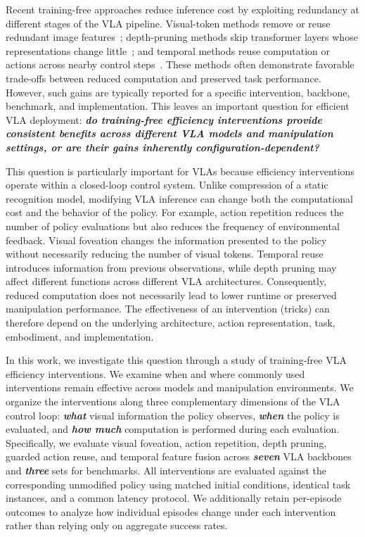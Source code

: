 Recent training-free approaches reduce inference cost by exploiting redundancy at different stages of the VLA pipeline. Visual-token methods remove or reuse redundant image features~\cite{fastv,vlacache,vlapruner}; depth-pruning methods skip transformer layers whose representations change little~\cite{shortgpt,efficientvla}; and temporal methods reuse computation or actions across nearby control steps~\cite{vlacache,flashvla,ttfvla}. These methods often demonstrate favorable trade-offs between reduced computation and preserved task performance. However, such gains are typically reported for a specific intervention, backbone, benchmark, and implementation. This leaves an important question for efficient VLA deployment: \textbf{\emph{do training-free efficiency interventions provide consistent benefits across different VLA models and manipulation settings, or are their gains inherently configuration-dependent?}}

This question is particularly important for VLAs because efficiency interventions operate within a closed-loop control system. Unlike compression of a static recognition model, modifying VLA inference can change both the computational cost and the behavior of the policy. For example, action repetition reduces the number of policy evaluations but also reduces the frequency of environmental feedback. Visual foveation changes the information presented to the policy without necessarily reducing the number of visual tokens. Temporal reuse introduces information from previous observations, while depth pruning may affect different functions across different VLA architectures. Consequently, reduced computation does not necessarily lead to lower runtime or preserved manipulation performance. The effectiveness of an intervention (tricks) can therefore depend on the underlying architecture, action representation, task, embodiment, and implementation.

In this work, we investigate this question through a study of training-free VLA efficiency interventions. We examine when and where commonly used interventions remain effective across models and manipulation environments. We organize the interventions along three complementary dimensions of the VLA control loop: \textbf{\emph{what}} visual information the policy observes, \textbf{\emph{when}} the policy is evaluated, and \textbf{\emph{how much}} computation is performed during each evaluation. Specifically, we evaluate visual foveation, action repetition, depth pruning, guarded action reuse, and temporal feature fusion across \textit{\textbf{seven}} VLA backbones and \textbf{\textit{three}} sets for benchmarks. All interventions are evaluated against the corresponding unmodified policy using matched initial conditions, identical task instances, and a common latency protocol. We additionally retain per-episode outcomes to analyze how individual episodes change under each intervention rather than relying only on aggregate success rates.

